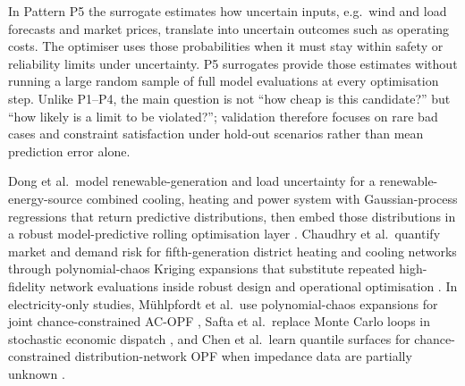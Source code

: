 In Pattern P5 the surrogate estimates how uncertain inputs, e.g.\ wind
and load forecasts and market prices, translate into uncertain outcomes
such as operating costs. The optimiser uses those probabilities when it
must stay within safety or reliability limits under uncertainty. P5
surrogates provide those estimates without running a large random sample
of full model evaluations at every optimisation step.
Unlike P1--P4, the main question is not ``how cheap is this candidate?''
but ``how likely is a limit to be violated?''; validation therefore
focuses on rare bad cases and constraint satisfaction under hold-out
scenarios rather than mean prediction error alone.

Dong et al.\ model renewable-generation and load uncertainty for a
renewable-energy-source combined cooling, heating and power system with
Gaussian-process regressions that return predictive distributions, then
embed those distributions in a robust model-predictive rolling
optimisation layer \cite{Dong2022}. Chaudhry et al.\ quantify market
and demand risk for fifth-generation district heating and cooling
networks through polynomial-chaos Kriging expansions that substitute
repeated high-fidelity network evaluations inside robust design and
operational optimisation \cite{Chaudhry2024}. In electricity-only
studies, M\"uhlpfordt et al.\ use polynomial-chaos expansions for joint
chance-constrained AC-OPF \cite{Muhlpfordt20194806}, Safta et al.\
replace Monte Carlo loops in stochastic economic dispatch
\cite{Safta20172535}, and Chen et al.\ learn quantile surfaces for
chance-constrained distribution-network OPF when impedance data are
partially unknown \cite{Chen2023657}.

